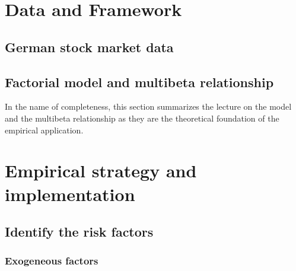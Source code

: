 \documentclass[hidelinks,11pts]{article}
\DeclareMathOperator{\1}{\mathbbm{1}}
\begin{document}
\begin{comment}
\emph{factors} of aggregate risk is compensated by $k$ 
of the risk premium by identifying the compensation of $k$ different 


Unlike the CAPM model that considers a unique risk premium, the factorial model considers that investors holding risk in their portfolios\footnote{We assume that said portfolios are sufficiently large so that any source of idiosyncratic risk can be diversified so that only aggregate risk is remunerated.} by holding a stock $j$, are compensated with $k$ different risk premia associated to $k$ common factors.%

\end{comment}





\section{Data and Framework} 

    \subsection{German stock market data} \label{sec:model}



    \subsection{Factorial model and multibeta relationship}

In the name of completeness, this section summarizes the lecture on the \cite{rossArbitrageTheoryCapital1976} model and the multibeta relationship as they are the theoretical foundation of the empirical application.



\section{Empirical strategy and implementation}

    \subsection{Identify the risk factors}

        \subsubsection{Exogeneous factors}
\end{document}
